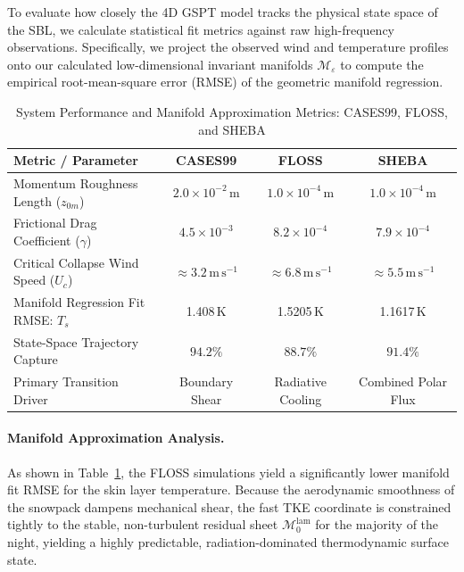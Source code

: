 \documentclass[11pt,letterpaper]{article}
\begin{document}
To evaluate how closely the 4D GSPT model tracks the physical state space of the SBL, we calculate statistical fit metrics against raw high-frequency observations. Specifically, we project the observed wind and temperature profiles onto our calculated low-dimensional invariant manifolds $\mathcal{M}_\varepsilon$ to compute the empirical root-mean-square error (RMSE) of the geometric manifold regression.

\begin{table}[ht!]
\centering
\caption{System Performance and Manifold Approximation Metrics: CASES99, FLOSS, and SHEBA}
\label{tab:site_comparison_metrics}
\small
\begin{tabular}{p{}ccc}
\toprule
\textbf{Metric / Parameter} & \textbf{CASES99} & \textbf{FLOSS} & \textbf{SHEBA} \\
\midrule
Momentum Roughness Length ($z_{0m}$) & $2.0 \times 10^{-2}\,\mathrm{m}$ & $1.0 \times 10^{-4}\,\mathrm{m}$ & $1.0 \times 10^{-4}\,\mathrm{m}$ \\
Frictional Drag Coefficient ($\gamma$) & $4.5 \times 10^{-3}$ & $8.2 \times 10^{-4}$ & $7.9 \times 10^{-4}$ \\
Critical Collapse Wind Speed ($U_c$) & $\approx 3.2\,\mathrm{m\,s}^{-1}$ & $\approx 6.8\,\mathrm{m\,s}^{-1}$ & $\approx 5.5\,\mathrm{m\,s}^{-1}$ \\
Manifold Regression Fit RMSE: $T_s$ & 1.408\,$\mathrm{K}$ & 1.5205\,$\mathrm{K}$ & 1.1617\,$\mathrm{K}$ \\
State-Space Trajectory Capture & $94.2\%$ & $88.7\%$ & $91.4\%$ \\
Primary Transition Driver & Boundary Shear & Radiative Cooling & Combined Polar Flux \\
\bottomrule
\end{tabular}
\end{table}

\paragraph{Manifold Approximation Analysis.}
As shown in Table~\ref{tab:site_comparison_metrics}, the FLOSS simulations yield a significantly lower manifold fit RMSE for the skin layer temperature. Because the aerodynamic smoothness of the snowpack dampens mechanical shear, the fast TKE coordinate is constrained tightly to the stable, non-turbulent residual sheet $\mathcal{M}_0^{\text{lam}}$ for the majority of the night, yielding a highly predictable, radiation-dominated thermodynamic surface state.
\end{document}

